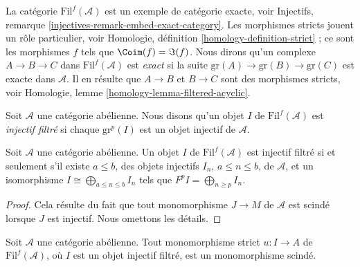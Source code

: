 \medskip\noindent
La catégorie $\text{Fil}^f(\mathcal{A})$ est un exemple de catégorie exacte,
voir Injectifs, remarque
\ref{injectives-remark-embed-exact-category}.
Les morphismes stricts jouent un rôle particulier, voir Homologie, définition
\ref{homology-definition-strict} ; ce sont les morphismes $f$ tels que
$\Coim(f) = \Im(f)$.
Nous dirons qu'un complexe $A \to B \to C$ dans
$\text{Fil}^f(\mathcal{A})$ est {\it exact} si la suite
$\text{gr}(A) \to \text{gr}(B) \to \text{gr}(C)$ est exacte dans
$\mathcal{A}$. Il en résulte que $A \to B$ et $B \to C$ sont des morphismes
stricts, voir Homologie, lemme
\ref{homology-lemma-filtered-acyclic}.

\begin{definition}
\label{definition-filtered-complexes-notation}
Soit $\mathcal{A}$ une catégorie abélienne.
Nous disons qu'un objet $I$ de $\text{Fil}^f(\mathcal{A})$ est
{\it injectif filtré} si chaque $\text{gr}^p(I)$ est un objet injectif de
$\mathcal{A}$.
\end{definition}

\begin{lemma}
\label{lemma-filtered-injective}
Soit $\mathcal{A}$ une catégorie abélienne.
Un objet $I$ de $\text{Fil}^f(\mathcal{A})$ est injectif filtré si et seulement
s'il existe $a \leq b$, des objets injectifs $I_n$, $a \leq n \leq b$, de
$\mathcal{A}$, et un isomorphisme
$I \cong \bigoplus_{a \leq n \leq b} I_n$ tels que
$F^pI = \bigoplus_{n \geq p} I_n$.
\end{lemma}

\begin{proof}
Cela résulte du fait que tout monomorphisme $J \to M$ de $\mathcal{A}$ est
scindé lorsque $J$ est injectif. Nous omettons les détails.
\end{proof}

\begin{lemma}
\label{lemma-split-strict-monomorphism}
Soit $\mathcal{A}$ une catégorie abélienne.
Tout monomorphisme strict $u : I \to A$ de $\text{Fil}^f(\mathcal{A})$, où
$I$ est un objet injectif filtré, est un monomorphisme scindé.
\end{lemma}

